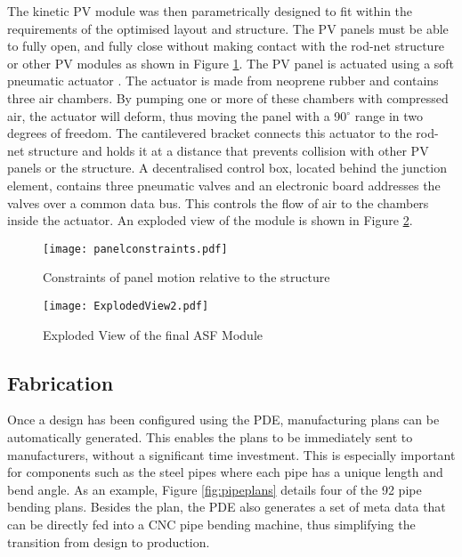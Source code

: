 The kinetic PV module was then parametrically designed to fit within the requirements of the optimised layout and structure. The PV panels must be able to fully open, and fully close without making contact with the rod-net structure or other PV modules as shown in Figure \ref{fig:constraints}. The PV panel is actuated using a soft pneumatic actuator \cite{Svetozarevic2017a}. The actuator is made from neoprene rubber and contains three air chambers. By pumping one or more of these chambers with compressed air, the actuator will deform, thus moving the panel with a 90$^{\circ}$ range in two degrees of freedom. The cantilevered bracket connects this actuator to the rod-net structure and holds it at a distance that prevents collision with other PV panels or the structure. A decentralised control box, located behind the junction element, contains three pneumatic valves and an electronic board addresses the valves over a common data bus. This controls the flow of air to the chambers inside the actuator. An exploded view of the module is shown in Figure \ref{fig:exploded}.


\begin{figure}
\begin{center}
\texttt{[image: panelconstraints.pdf]}
\caption{Constraints of panel motion relative to the structure}
\label{fig:constraints}
\end{center}
\end{figure}

\begin{figure}
\begin{center}
\texttt{[image: ExplodedView2.pdf]}
\caption{Exploded View of the final ASF Module}
\label{fig:exploded}
\end{center}
\end{figure}

\subsection{Fabrication}

Once a design has been configured using the PDE, manufacturing plans can be automatically generated. This enables the plans to be immediately sent to manufacturers, without a significant time investment. This is especially important for components such as the steel pipes where each pipe has a unique length and bend angle. As an example, Figure \ref{fig:pipeplans} details four of the 92 pipe bending plans. Besides the plan, the PDE also generates a set of meta data that can be directly fed into a CNC pipe bending machine, thus simplifying the transition from design to production.  

